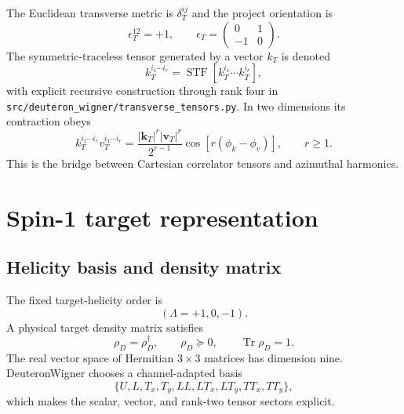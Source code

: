 \documentclass[11pt,oneside]{book}
\newcommand{\kT}{\bm{k}_{T}}
\newcommand{\Tr}{\operatorname{Tr}}
\newcommand{\codepath}[1]{\nolinkurl{#1}}
\begin{document}
The Euclidean transverse metric is $\delta_T^{ij}$ and the project orientation is
\begin{equation}
 \epsilon_T^{12}=+1,
 \qquad
 \epsilon_T=\begin{pmatrix}0&1\\-1&0\end{pmatrix}.
 \label{eq:epsilon-convention}
\end{equation}
The symmetric-traceless tensor generated by a vector $k_T$ is denoted
\begin{equation}
 k_T^{i_1\cdots i_r}
 = \operatorname{STF}\!\left[k_T^{i_1}\cdots k_T^{i_r}\right],
 \label{eq:stf-def}
\end{equation}
with explicit recursive construction through rank four in \codepath{src/deuteron_wigner/transverse_tensors.py}.  In two dimensions its contraction obeys
\begin{equation}
 k_T^{i_1\cdots i_r}v_T^{i_1\cdots i_r}
 =\frac{|\kT|^r|\bm v_T|^r}{2^{r-1}}
 \cos\!\left[r(\phi_k-\phi_v)\right],\qquad r\geq1.
 \label{eq:rank-harmonic}
\end{equation}
This is the bridge between Cartesian correlator tensors and azimuthal harmonics.

\chapter{Spin-1 target representation}
\label{chap:spin1}

\section{Helicity basis and density matrix}

The fixed target-helicity order is
\begin{equation}
 (\Lambda=+1,0,-1).
 \label{eq:helicity-order}
\end{equation}
A physical target density matrix satisfies
\begin{equation}
 \rho_D=\rho_D^\dagger,\qquad \rho_D\succeq0,
 \qquad \Tr\rho_D=1.
 \label{eq:target-density}
\end{equation}
The real vector space of Hermitian $3\times3$ matrices has dimension nine.  DeuteronWigner chooses a channel-adapted basis
\begin{equation}
 \{U,L,T_x,T_y,LL,LT_x,LT_y,TT_x,TT_y\},
 \label{eq:spin1-basis-set}
\end{equation}
which makes the scalar, vector, and rank-two tensor sectors explicit.
\end{document}
